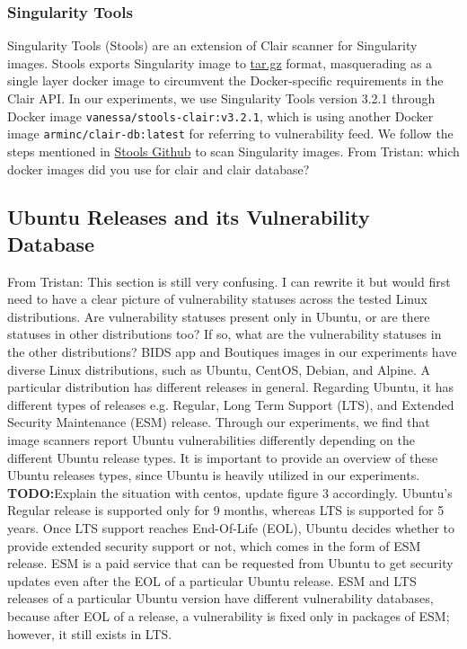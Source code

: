 \documentclass[a4paper,num-refs]{oup-contemporary}
\newcommand{\todo}[1]{\color{red}\textbf{TODO:}#1\color{black}}
\newcommand{\tristan}[1]{\color{blue}From Tristan: #1\color{black}}
\begin{document}
\subsubsection{Singularity Tools}

Singularity Tools (Stools)
are an extension of Clair scanner for Singularity images. Stools
exports Singularity image to \url{tar.gz} format, masquerading as a single layer docker image
to circumvent the Docker-specific requirements in the Clair API.
In our experiments, we use Singularity Tools version 3.2.1 through Docker
image
\texttt{vanessa/stools-clair:v3.2.1}, which is using another Docker
image \texttt{arminc/clair-db:latest} for referring to vulnerability feed.
We follow the steps mentioned in
\href{https://github.com/singularityhub/stools}{Stools Github} to scan
Singularity images. \tristan{which docker images did you use for clair and clair database?}

\subsection{Ubuntu Releases and its Vulnerability Database}

\tristan{This section is still very confusing. I can rewrite it but would first need to
have a clear picture of vulnerability statuses across the tested Linux distributions. 
Are vulnerability statuses present only in Ubuntu, or are there statuses in other distributions too?
If so, what are the vulnerability statuses in the other distributions?
}
BIDS app and Boutiques images in our experiments have diverse Linux
distributions, such as Ubuntu, CentOS, Debian, and Alpine. A particular
distribution has different releases in general. Regarding Ubuntu, it has different
types of releases e.g. Regular, Long Term Support (LTS), and Extended Security Maintenance (ESM) release.
Through our experiments, we find that image scanners report Ubuntu vulnerabilities 
differently depending on the different Ubuntu release types. It is 
important to provide an overview of these Ubuntu releases types, 
since Ubuntu is heavily utilized in our experiments. 
\todo{Explain the situation with centos, update figure 3 accordingly.}
Ubuntu's Regular release is supported only for 9 months, whereas LTS is supported for 5 years. Once LTS support
reaches End-Of-Life (EOL), Ubuntu decides whether to provide extended security support or not, which comes
in the form of ESM release.
ESM is a paid service that can be requested from Ubuntu to get security 
updates even after the EOL of a particular Ubuntu release. ESM and LTS releases of a particular Ubuntu version have different vulnerability
databases, because after EOL of a release, a vulnerability is fixed only in packages of ESM; however, it still
exists in LTS.
\end{document}

